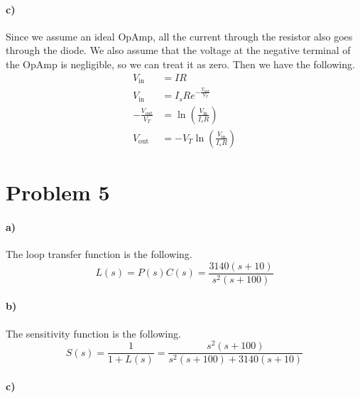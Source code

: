 \documentclass[12pt]{article}
\begin{document}
\paragraph{c)}

Since we assume an ideal OpAmp, all the current through the resistor also goes
through the diode. We also assume that the voltage at the negative terminal of the OpAmp
is negligible, so we can treat it as zero. Then we have the following.
\begin{align*}
    V_\text{in}&=IR\\
    V_\text{in}&=I_sRe^{-\frac{V_\text{out}}{V_T}}\\
    -\frac{V_\text{out}}{V_T}&=\ln\left(\frac{V_\text{in}}{I_sR}\right)\\
    V_\text{out}&=-V_T\ln\left(\frac{V_\text{in}}{I_sR}\right)
\end{align*}

\section*{Problem 5}

\paragraph{a)}

The loop transfer function is the following.
\[L(s)=P(s)C(s)=\frac{3140(s+10)}{s^2(s+100)}\]

\paragraph{b)}

The sensitivity function is the following.
\[S(s)=\frac{1}{1+L(s)}=\frac{s^2(s+100)}{s^2(s+100)+3140(s+10)}\]

\paragraph{c)}
\end{document}
